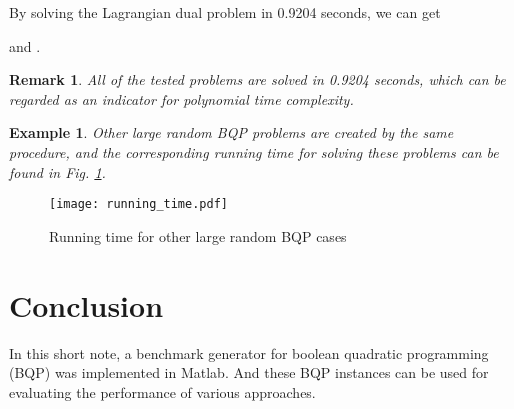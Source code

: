 \documentclass[conference]{IEEEtran}
\newtheorem{remark}{Remark}
\newtheorem{example}{Example}
\begin{document}
By solving the Lagrangian dual problem  in 0.9204 seconds, we can get

and .

\begin{remark}
	All of the tested problems are solved in 0.9204 seconds, which can be regarded as an indicator for polynomial time complexity.
\end{remark}

\begin{example}
\textup{Other large random BQP problems are created by the same procedure, and the corresponding running time for solving these problems can be found in Fig. \ref{fig_runtime}.}
\end{example}

\begin{figure}[htbp]
	\centerline{\texttt{[image: running\_time.pdf]}}
	\caption{Running time for other large random BQP cases}
	\label{fig_runtime}
\end{figure}



\section{Conclusion}
In this short note, a benchmark generator for boolean quadratic programming (BQP) was implemented in Matlab. And these BQP instances can be used for evaluating the performance of various approaches. 
\end{document}
